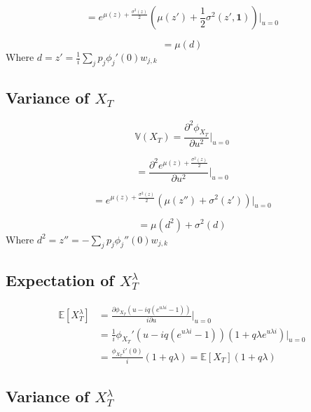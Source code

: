 \documentclass[12pt]{article}
\theoremstyle{definition}
\begin{document}
 \begin{equation}
 = e^{\mu(z)+\frac{\sigma^2(z)}{2} } \left(\mu(z')+\frac{1}{2} \sigma^2 (z', \mathbf{1})\right) \bigg|_{u=0}\end{equation}
 
 \begin{equation}
 =\mu(d)
 \end{equation}
 Where \(d=z'=\frac{1}{i}\sum_j p_j \phi_j'(0) w_{j, k} \)
 
 \subsection{Variance of \(X_T\)}
 
\begin{equation}
\mathbb{V}(X_T)=\frac{\partial^2 \phi_{X_T}}{\partial u^2} \big|_{u=0}
\end{equation}

\begin{equation}
 =\frac{\partial ^2 e^{\mu(z)+\frac{\sigma^2(z)}{2} }}{\partial u^2} \bigg|_{u=0}\end{equation}
 
 \begin{equation}
 = e^{\mu(z)+\frac{\sigma^2(z)}{2} } \left(\mu(z'')+ \sigma^2 (z') \right) \bigg|_{u=0}\end{equation}
 
 \begin{equation}
 =\mu(d^2)+\sigma^2 (d)
 \end{equation}
 Where \(d^2=z''=-\sum_j p_j \phi_j''(0) w_{j, k} \)
 
 \subsection{Expectation of \(X_T ^ \lambda \)}


\begin{align} \mathbb{E}[X_T ^ \lambda]&=\frac{\partial \phi_{X_T}\left(u-iq(e^{u\lambda i}-1)\right) }{i\partial u} \bigg|_{u=0}\\
&=\frac{1}{i} \phi_{X_T}'\left(u-iq(e^{u\lambda i}-1)\right) \left(1+q\lambda e^{u\lambda i}\right) \big|_{u=0} \\
&=\frac{ \phi_{X_T}i ' (0)}{i}(1+q \lambda) = \mathbb{E}[X_T] (1+q \lambda)\end{align}

 
  \subsection{Variance of \(X_T ^ \lambda \)}
\end{document}
